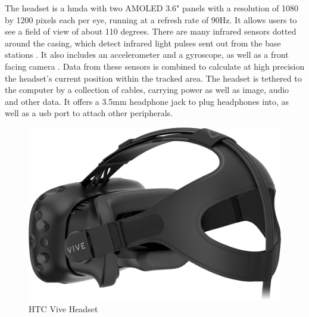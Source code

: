 The headset is a \gls{hmda} with two AMOLED 3.6" panels with a resolution of 1080 by 1200 pixels each per eye, running at a refresh rate of 90Hz. It allows users to see a field of view of about 110 degrees. 
\newline
There are many infrared sensors dotted around the casing, which detect infrared light pulses sent out from the base stations \autocite{lighthouseHowWork}. It also includes an accelerometer and a gyroscope, as well as a front facing camera \autocite{viveProductPage}. Data from these sensors is combined to calculate at high precision the headset's current position within the tracked area.
\newline
The headset is tethered to the computer by a collection of cables, carrying power as well as image, audio and other data. It offers a 3.5mm headphone jack to plug headphones into, as well as a usb port to attach other peripherals.
\begin{figure}[h]
    \centering
    \includegraphics[height=0.2\textheight]{figures/vive-hardware-hmd-1}
    \caption{HTC Vive Headset \autocite{viveProductPage}}
    \label{fig:headset}
\end{figure}


